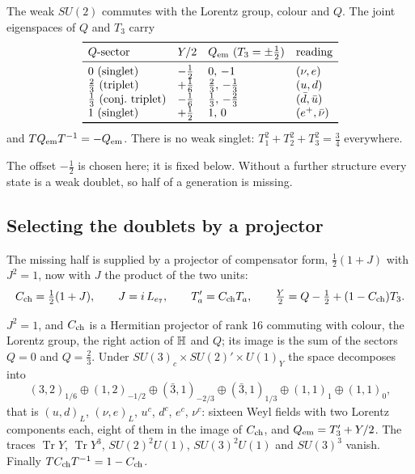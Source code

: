\begin{proposition}[Doublets]\label{prop:doublets}
The weak \(SU(2)\) commutes with the Lorentz group, colour and \(Q\).  The joint eigenspaces of \(Q\) and \(T_3\) carry
\[
\begin{array}{llll}
\toprule
Q\text{-sector} & Y/2 & Q_{\rm em}\ (T_3=\pm\tfrac12) & \text{reading}\\
\midrule
0\ (\text{singlet}) & -\tfrac12 & 0,\,-1 & (\nu,e)\\
\tfrac23\ (\text{triplet}) & +\tfrac16 & \tfrac23,\,-\tfrac13 & (u,d)\\
\tfrac13\ (\text{conj.\ triplet}) & -\tfrac16 & \tfrac13,\,-\tfrac23 & (\bar d,\bar u)\\
1\ (\text{singlet}) & +\tfrac12 & 1,\,0 & (e^+,\bar\nu)\\
\bottomrule
\end{array}
\]
and \(TQ_{\rm em}T^{-1}=-Q_{\rm em}\).  There is no weak singlet: \(T_1^2+T_2^2+T_3^2=\tfrac34\) everywhere.
\end{proposition}

The offset \(-\tfrac12\) is chosen here; it is fixed below.  Without a further structure every state is a weak doublet, so half of a
generation is missing.

\subsection{Selecting the doublets by a projector}

The missing half is supplied by a projector of compensator form, \(\tfrac12(1+J)\) with \(J^2=1\), now with \(J\) the product of the two
units:
\[
C_{\rm ch}=\tfrac12(1+J),\qquad J=i\,L_{e_7},\qquad T_a'=C_{\rm ch}T_a,\qquad
\tfrac Y2=Q-\tfrac12+(1-C_{\rm ch})T_3 .
\]

\begin{proposition}\label{prop:generation}
\(J^2=1\), and \(C_{\rm ch}\) is a Hermitian projector of rank \(16\) commuting with colour, the Lorentz group, the right action of \(\mathbb H\) and
\(Q\); its image is the sum of the sectors \(Q=0\) and \(Q=\tfrac23\).  Under \(SU(3)_c\times SU(2)'\times U(1)_Y\) the space decomposes into
\[
(3,2)_{1/6}\oplus(1,2)_{-1/2}\oplus(\bar3,1)_{-2/3}\oplus(\bar3,1)_{1/3}\oplus(1,1)_{1}\oplus(1,1)_{0},
\]
that is \((u,d)_L\), \((\nu,e)_L\), \(u^c\), \(d^c\), \(e^c\), \(\nu^c\): sixteen Weyl fields with two Lorentz components each, eight of them
in the image of \(C_{\rm ch}\), and
\(Q_{\rm em}=T_3'+Y/2\).  The traces \(\operatorname{Tr}Y\), \(\operatorname{Tr}Y^3\), \(SU(2)^2U(1)\), \(SU(3)^2U(1)\) and \(SU(3)^3\) vanish.  Finally
\(TC_{\rm ch}T^{-1}=1-C_{\rm ch}\).
\end{proposition}

